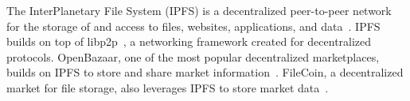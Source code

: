The InterPlanetary File System (IPFS) is a decentralized peer-to-peer network for the storage of and access to files, websites, applications, and data~\cite{benet2014ipfs}.
IPFS builds on top of libp2p~\cite{benet2018libp2p}, a networking framework created for decentralized protocols.
OpenBazaar, one of the most popular decentralized marketplaces, builds on IPFS to store and share market information~\cite{openbazaar}.
FileCoin, a decentralized market for file storage, also leverages IPFS to store market data~\cite{benet2018filecoin}.


